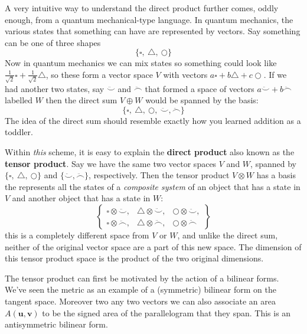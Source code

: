 	A very intuitive way to understand the direct product further comes, oddly enough, from a quantum mechanical-type language. In quantum mechanics, the various states that something can have are represented by vectors. Say something can be one of three shapes
	\begin{equation*}
		\{ \square, ~ \triangle,  ~ \bigcirc \}
	\end{equation*}
	Now in quantum mechanics we can mix states so something could look like $\frac{1}{\sqrt 2} \square + \frac{1}{\sqrt 2} \triangle$, so these form a vector space $V$ with vectors $a \square + b \triangle + c \bigcirc$. If we had another two states, say $\ddot \smile$ and $\ddot \frown$ that formed a space of vectors $a \ddot \smile + b \ddot \frown$ labelled $W$ then the direct sum $V \oplus W$ would be spanned by the basis:
	\begin{equation*}
		\{ \square, ~ \triangle,  ~ \bigcirc, ~ \ddot \smile, \ddot \frown \}
	\end{equation*}
	The idea of the direct sum should resemble exactly how you learned addition as a toddler.
	
	Within \emph{this} scheme, it is easy to explain the \textbf{direct product} also known as the \textbf{tensor product}. Say we have the same two vector spaces $V$ and $W$, spanned by $\{ \square, ~ \triangle,  ~ \bigcirc \}$ and $\{ \ddot \smile, \ddot \frown \}$, respectively. Then the tensor product $V \otimes W$ has a basis the represents all the states of a \emph{composite system} of an object that has a state in $V$ and another object that has a state in $W$:
	\begin{equation}
		\begin{Bmatrix}
		 \square \otimes \ddot \smile, & \triangle \otimes \ddot \smile,  & \bigcirc  \otimes \ddot \smile, \\
		\square \otimes \ddot \frown, & \triangle \otimes \ddot \frown,  & \bigcirc  \otimes \ddot \frown~	
		\end{Bmatrix}
	\end{equation}
	this is a completely different space from $V$ or $W$, and unlike the direct sum, neither of the original vector space are a part of this new space. The dimension of this tensor product space is the product of the two original dimensions.
	
	The tensor product can first be motivated by the action of a bilinear forms. We've seen the metric as an example of a (symmetric) bilinear form on the tangent space. Moreover two any two vectors we can also associate an area $A(\mathbf u, \mathbf v)$ to be the signed area of the parallelogram that they span. This is an antisymmetric bilinear form.
	
